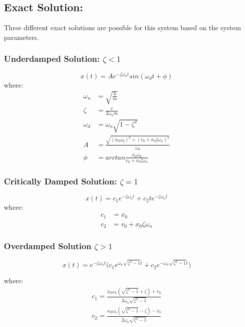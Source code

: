 \documentclass [a4paper, 12pt]{article}
\begin{document}
\subsection*{Exact Solution:}
Three different exact solutions are possible for this system based on the system parameters.

\subsubsection*{Underdamped Solution: $\zeta < 1$}
\begin{equation*}
	x(t) = A e^{-\zeta \omega_n t} sin(\omega_dt + \phi)			
\end{equation*}
where:
\begin{align*}
	\omega_n &= \sqrt{\frac{k}{m}} \\
	\zeta &= \frac{c}{2\omega_nm}\\
	\omega_d &= \omega_n \sqrt{1- \zeta^2}	\\
	A &= \frac{\sqrt{(x_0\omega_d)^2 + (v_0 + x_0\zeta\omega_n)^2}}{\omega_d}\\
	\phi &= arctan\frac{x_0\omega_d}{v_0+x_0\zeta\omega_n}
\end{align*}

\subsubsection*{Critically Damped Solution: $\zeta = 1$}		
\begin{equation*}
	x(t) = c_1 e^{-\zeta \omega_n t} + c_2te^{-\zeta \omega_n t}
\end{equation*}
where:
\begin{align*}
	c_1 &= x_0\\
	c_2 &= v_0 + x_0\zeta\omega_n
\end{align*}

\subsubsection*{Overdamped Solution $\zeta > 1$}
\begin{equation*}
	x(t) = e^{-\zeta \omega_n t} \big(c_1e^{\omega_n\sqrt{\zeta^2 -1}t} + c_2e^{-\omega_n\sqrt{\zeta^2-1}t}\big)
\end{equation*}

where:
\begin{align*}
	c_1 = \frac{x_0\omega_n(\sqrt{\zeta^2-1}+\zeta)+ v_0}{2\omega_n\sqrt{\zeta^2-1}}\\
	c_2 = \frac{x_0\omega_n(\sqrt{\zeta^2-1}-\zeta)- v_0}{2\omega_n\sqrt{\zeta^2-1}}\\
\end{align*}
\end{document}
